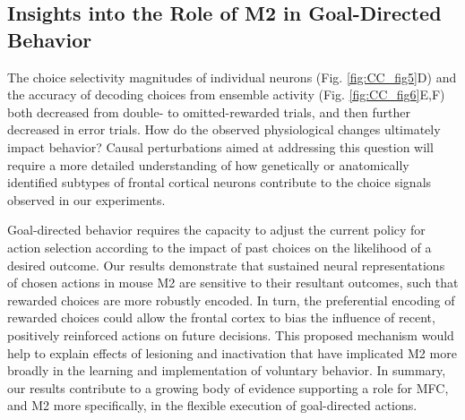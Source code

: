 \subsection{Insights into the Role of M2 in Goal-Directed Behavior}
The choice selectivity magnitudes of individual neurons (Fig. \ref{fig:CC_fig5}D) and the accuracy of decoding choices from ensemble activity (Fig. \ref{fig:CC_fig6}E,F) both decreased from double- to omitted-rewarded trials, and then further decreased in error trials. How do the observed physiological changes ultimately impact behavior? Causal perturbations aimed at addressing this question will require a more detailed understanding of how genetically \citep{kvitsiani2013distinct, pinto2015cell, kamigaki2017delay} or anatomically identified subtypes of frontal cortical neurons \citep{li2015motor, chen2017map, otis2017prefrontal} contribute to the choice signals observed in our experiments.

Goal-directed behavior requires the capacity to adjust the current policy for action selection according to the impact of past choices on the likelihood of a desired outcome. Our results demonstrate that sustained neural representations of chosen actions in mouse M2 are sensitive to their resultant outcomes, such that rewarded choices are more robustly encoded. In turn, the preferential encoding of rewarded choices could allow the frontal cortex to bias the influence of recent, positively reinforced actions on future decisions. This proposed mechanism would help to explain effects of lesioning \citep{passingham1988premotor, gremel2013premotor} and inactivation \citep{siniscalchi2016fast, makino2017transformation} that have implicated M2 more broadly in the learning and implementation of voluntary behavior. In summary, our results contribute to a growing body of evidence supporting a role for MFC, and M2 more specifically, in the flexible execution of goal-directed actions.